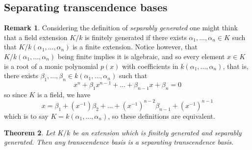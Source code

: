 \documentclass[12pt]{article}
\theoremstyle{plain}
\newtheorem{thm}{Theorem}[subsection] %
\theoremstyle{definition}
\newtheorem{remark}[thm]{Remark}
\begin{document}
	\subsection{Separating transcendence bases}
	\begin{remark}
		Considering the definition of \emph{separably generated} one might think that a field extension $K/k$ is finitely generated if there exists $\alpha_1,...,\alpha_n \in K$ such that $K/k(\alpha_1,...,\alpha_n)$ is a finite extension. Notice however, that $K/k(\alpha_1,...,\alpha_n)$ being finite implies it is algebraic, and so every element $x \in K$ is a root of a monic polynomial $p(x)$ with coefficients in $k(\alpha_1,...,\alpha_n)$, that is, there exists $\beta_1,...,\beta_n \in k(\alpha_1,...,\alpha_n)$ such that
		\[x^n + \beta_1 x^{n-1} + \hdots + \beta_{n-1}x + \beta_n = 0\]
		so since $K$ is a field, we have
		\[x = \beta_1 + (x^{-1})\beta_2 + \hdots + (x^{-1})^{n-2}\beta_{n-1} + (x^{-1})^{n-1}\]
		which is to say $K = k(\alpha_1,...,\alpha_n)$, so these definitions are equivalent.
	\end{remark}
	\begin{thm}
		\label{thm:sep_transc_subset}
		Let $K/k$ be an extension which is finitely generated and separably generated. Then any transcendence basis is a separating transcendence basis.
	\end{thm}
\end{document}
